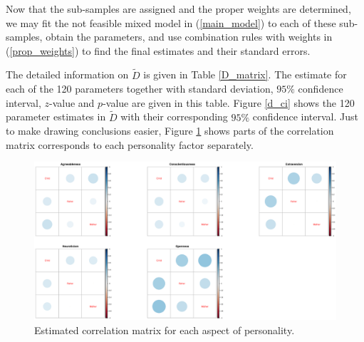 \documentclass[11pt,a5paper,twoside]{book}
\begin{document}
Now that the sub-samples are assigned and the proper weights are determined, we may fit the not feasible mixed model in (\ref{main_model}) to each of these sub-samples, obtain the parameters, and use combination rules with weights in (\ref{prop_weights}) to find the final estimates and their standard errors.

The detailed information on $\tilde{D}$ is given in Table \ref{D_matrix}. The estimate for each of the 120 parameters together with standard deviation, $95\%$ confidence interval, $z$-value and $p$-value are given in this table. Figure \ref{d_ci} shows the 120 parameter estimates in $\tilde{D}$ with their corresponding $95\%$ confidence interval. Just to make drawing conclusions easier, Figure \ref{corr_sep} shows parts of the correlation matrix corresponds to each personality factor separately.



\begin{figure}
\centering
\includegraphics[width=\textwidth]{cor_separate.eps}
\caption{Estimated correlation matrix for each aspect of personality.} \label{corr_sep}
\end{figure} 
\end{document}
